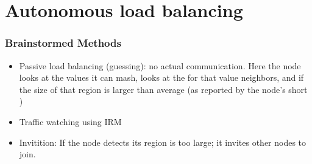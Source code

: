 


\section{Autonomous load balancing}



\subsubsection{Brainstormed Methods}
\begin{itemize}
	\item Passive load balancing (guessing):  no actual communication.
	Here the node looks at the values it can mash, looks at the for that value neighbors, and if the size of that region is larger than average (as reported by the node's short )
	\item Traffic watching using IRM
	\item Invitition:  If the node detects its region is too large; it invites other nodes to join.
\end{itemize}

